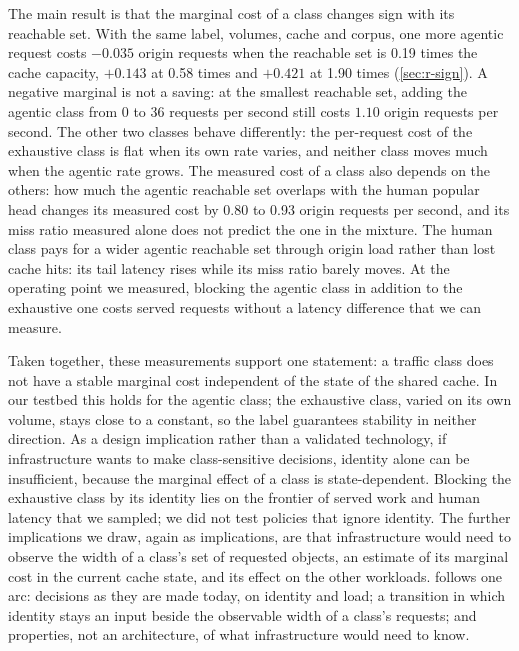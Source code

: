 The main result is that the marginal cost of a class changes sign with its reachable
set.
With the same label, volumes, cache and corpus, one more agentic request costs $-0.035$
origin requests when the reachable set is 0.19 times the cache capacity, $+0.143$ at 0.58
times and $+0.421$ at 1.90 times (\cref{sec:r-sign}).
A negative marginal is not a saving: at the smallest reachable set, adding the agentic
class from 0 to 36 requests per second still costs $1.10$ origin requests per
second.
The other two classes behave differently: the per-request cost of the exhaustive class is
flat when its own rate varies, and neither class moves much when the agentic rate
grows.
The measured cost of a class also depends on the others: how much the agentic reachable set
overlaps with the human popular head changes its measured cost by 0.80 to 0.93 origin
requests per second, and its miss ratio measured alone does not predict the one in the
mixture.
The human class pays for a wider agentic reachable set through origin load rather than
lost cache hits: its tail latency rises while its miss ratio barely
moves.
At the operating point we measured, blocking the agentic class in addition to the
exhaustive one costs served requests without a latency difference that we can
measure.

Taken together, these measurements support one statement: a traffic class does not have a
stable marginal cost independent of the state of the shared cache.
In our testbed this holds for the agentic class; the exhaustive class, varied on its own
volume, stays close to a constant, so the label guarantees stability in neither
direction.
As a design implication rather than a validated technology, if infrastructure wants to make
class-sensitive decisions, identity alone can be insufficient, because the marginal
effect of a class is state-dependent.
Blocking the exhaustive class by its identity lies on the frontier of served work and human
latency that we sampled; we did not test policies that ignore identity.
The further implications we draw, again as implications, are that infrastructure would
need to observe the width of a class's set of requested objects, an estimate of its
marginal cost in the current cache state, and its effect on the other
workloads.
 follows one arc: decisions as they are made today, on identity and
load; a transition in which identity stays an input beside the observable width of a
class's requests; and properties, not an architecture, of what infrastructure would need to
know.

